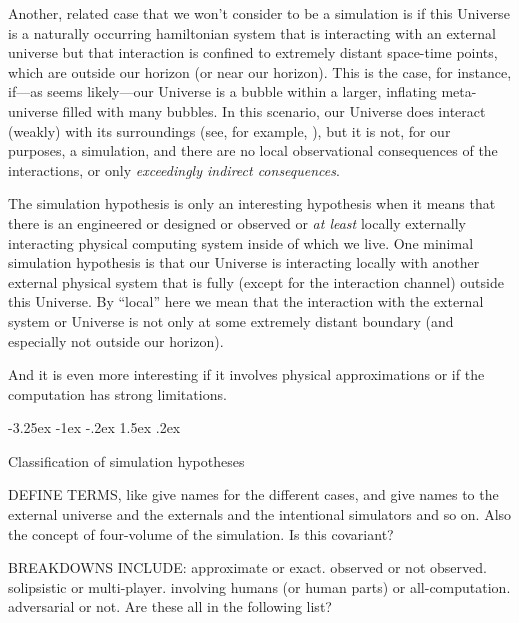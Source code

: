 \documentclass[letterpaper]{article}
\makeatletter
\renewcommand\section{\@startsection {section}{1}{\z@}%
  {-3.25ex \@plus -1ex \@minus -.2ex}%
  {1.5ex \@plus .2ex}%
  {\raggedright\normalfont\large\bfseries}}
\makeatother
\begin{document}
Another, related case that we won't consider to be a simulation is if this Universe is a naturally occurring hamiltonian system that is interacting with an external universe but that interaction is confined to extremely distant space-time points, which are outside our horizon (or near our horizon).
This is the case, for instance, if---as seems likely---our Universe is a bubble within a larger, inflating meta-universe filled with many bubbles.
In this scenario, our Universe does interact (weakly) with its surroundings (see, for example, \cite{kleban}), but it is not, for our purposes, a simulation, and there are no local observational consequences of the interactions, or only \emph{exceedingly indirect consequences}.

The simulation hypothesis is only an interesting hypothesis when it means that there is an engineered or designed or observed or \emph{at least} locally externally interacting physical computing system inside of which we live.
One minimal simulation hypothesis is that our Universe is interacting locally with another external physical system that is fully (except for the interaction channel) outside this Universe.
By ``local'' here we mean that the interaction with the external system or Universe is not only at some extremely distant boundary (and especially not outside our horizon).

And it is even more interesting if it involves physical approximations or if the computation has strong limitations.

\section{Classification of simulation hypotheses}

DEFINE TERMS, like give names for the different cases, and give names to the external universe and the externals and the intentional simulators and so on. Also the concept of four-volume of the simulation. Is this covariant?

BREAKDOWNS INCLUDE: approximate or exact. observed or not observed. solipsistic or multi-player. involving humans (or human parts) or all-computation. adversarial or not. Are these all in the following list?
\end{document}
